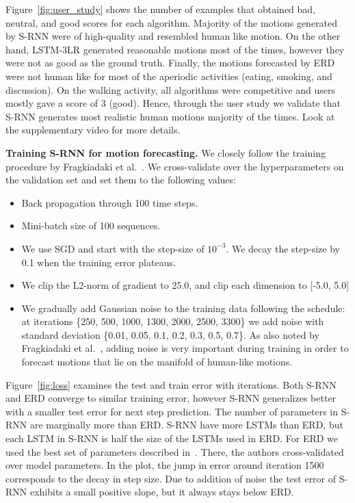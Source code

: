 \documentclass[10pt,twocolumn,letterpaper]{article}
\begin{document}
Figure~\ref{fig:user_study} shows the number of examples that obtained bad, neutral, and good scores for each algorithm. Majority of the motions generated by S-RNN were of high-quality and resembled human like motion. On the other hand, LSTM-3LR generated reasonable motions most of the times, however they were not as good as the ground truth. Finally, the motions forecasted by ERD were not human like for most of the aperiodic activities (eating, smoking, and discussion). On the walking activity, all algorithms were competitive and users mostly gave a score of 3 (good). Hence, through the user study we validate that S-RNN generates most realistic human motions majority of the times. Look at the supplementary video for more details. 

\noindent \textbf{Training S-RNN for motion forecasting.} We closely follow the training procedure by Fragkiadaki et al.~\citep{Fragkiadaki15}. We cross-validate over the hyperparameters on the validation set and set them to the following values:
\begin{itemize}
\item Back propagation through 100 time steps.
\item Mini-batch size of 100 sequences.
\item We use SGD and start with the step-size of $10^{-3}$. We decay the step-size by 0.1 when the training error plateaus. 
\item We clip the L2-norm of gradient to 25.0, and clip each dimension to [-5.0, 5.0]
\item We gradually add Gaussian noise to the training data following the schedule: at iterations \{250, 500, 1000, 1300, 2000, 2500, 3300\} we add noise with standard deviation \{0.01, 0.05, 0.1, 0.2, 0.3, 0.5, 0.7\}. As also noted by Fragkiadaki et al.~\citep{Fragkiadaki15}, adding noise is very important during training in order to forecast motions that lie on the manifold of human-like motions. 
\end{itemize}

Figure~\ref{fig:loss} examines the test and train error with iterations. Both S-RNN and ERD converge to similar training error, however S-RNN generalizes better with a smaller test error for next step prediction. The number of parameters in S-RNN are marginally more than ERD. S-RNN have more LSTMs than ERD, but each LSTM in S-RNN is half the size of the LSTMs used in ERD. For ERD we used the best set of parameters described in~\citep{Fragkiadaki15}. There, the authors cross-validated over model parameters. In the plot, the  jump in error around iteration 1500 corresponds to the decay in step size. Due to addition of noise the test error of S-RNN exhibits a small positive slope, but it always stays below ERD.
\end{document}
